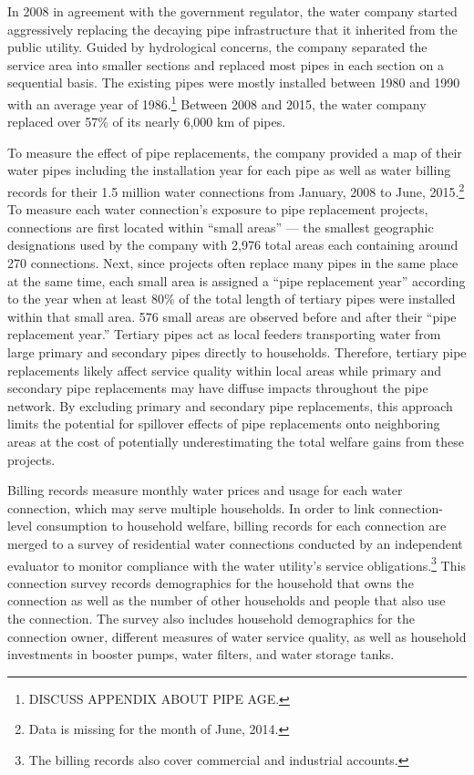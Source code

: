 \documentclass[12pt,table]{article}
\begin{document}
In 2008 in agreement with the government regulator, the water company started aggressively replacing the decaying pipe infrastructure that it inherited from the public utility.  Guided by hydrological concerns, the company separated the service area into smaller sections and replaced most pipes in each section on a sequential basis.  The existing pipes were mostly installed between 1980 and 1990 with an average year of 1986.\footnote{DISCUSS APPENDIX ABOUT PIPE AGE.}  Between 2008 and 2015, the water company replaced over 57\% of its nearly 6,000 km of pipes.

To measure the effect of pipe replacements, the company provided a map of their water pipes including the installation year for each pipe as well as water billing records for their 1.5 million water connections from January, 2008 to June, 2015.\footnote{Data is missing for the month of June, 2014.}  To measure each water connection's exposure to pipe replacement projects, connections are first located within ``small areas'' --- the smallest geographic designations used by the company with 2,976 total areas each containing around 270 connections.  Next, since projects often replace many pipes in the same place at the same time, each small area is assigned a ``pipe replacement year'' according to the year when at least 80\% of the total length of tertiary pipes were installed within that small area.  576 small areas are observed before and after their ``pipe replacement year.''  Tertiary pipes act as local feeders transporting water from large primary and secondary pipes directly to households.  Therefore, tertiary pipe replacements likely affect service quality within local areas while primary and secondary pipe replacements may have diffuse impacts throughout the pipe network.  By excluding primary and secondary pipe replacements, this approach limits the potential for spillover effects of pipe replacements onto neighboring areas at the cost of potentially underestimating the total welfare gains from these projects.  %

Billing records measure monthly water prices and usage for each water connection, which may serve multiple households.  In order to link connection-level consumption to household welfare, billing records for each connection are merged to a survey of residential water connections conducted by an independent evaluator to monitor compliance with the water utility's service obligations.\footnote{The billing records also cover commercial and industrial accounts.}  This connection survey records demographics for the household that owns the connection as well as the number of other households and people that also use the connection.  The survey also includes household demographics for the connection owner, different measures of water service quality, as well as household investments in booster pumps, water filters, and water storage tanks.
\end{document}

